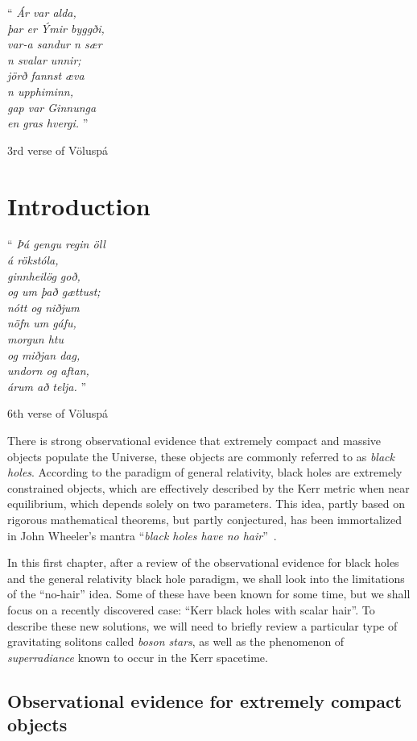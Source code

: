 \thispagestyle{empty}
\epigraph{ 
``\emph{
Ár var alda, \\
þar er Ýmir byggði, \\
var-a sandur n sær \\
n svalar unnir; \\
jörð fannst æva \\
n upphiminn, \\
gap var Ginnunga \\
en gras hvergi.}
''}{3rd verse of Völuspá}
\chapter{Introduction}
\label{ch:intro}

\epigraph{``\emph{
Þá gengu regin öll \\
á rökstóla, \\
ginnheilög goð, \\
og um það gættust; \\
nótt og niðjum \\
nöfn um gáfu, \\ 
morgun htu \\
og miðjan dag, \\
undorn og aftan, \\
árum að telja.} 
''}{6th verse of Völuspá}


There is strong observational evidence that extremely compact and massive objects populate the Universe, these objects are commonly referred to as \textit{black holes}.
According to the paradigm of general relativity, black holes are extremely constrained objects, which are effectively described by the Kerr metric when near equilibrium, which depends solely on two parameters.
This idea, partly based on rigorous mathematical theorems, but partly conjectured, has been immortalized in John Wheeler's mantra ``\textit{black holes have no hair}''~\cite{Misner:1974qy}. 


In this first chapter, after a review of the observational evidence for black holes and the general relativity black hole paradigm, we shall look into the limitations of the ``no-hair'' idea.
Some of these have been known for some time, but we shall focus on a recently discovered case: ``Kerr black holes with scalar hair''.
To describe these new solutions, we will need to briefly review a particular type of gravitating solitons called \textit{boson stars}, as well as the phenomenon of \textit{superradiance} known to occur in the Kerr spacetime.
   
\section{Observational evidence for extremely compact objects}

